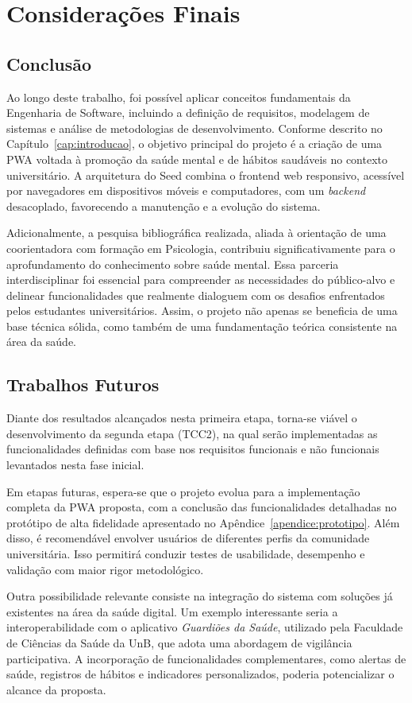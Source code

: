 \chapter{Considerações Finais}

\section{Conclusão}


Ao longo deste trabalho, foi possível aplicar conceitos fundamentais da Engenharia de Software, incluindo a definição de requisitos, modelagem de sistemas e análise de metodologias de desenvolvimento. Conforme descrito no Capítulo~\ref{cap:introducao}, o objetivo principal do projeto é a criação de uma PWA voltada à promoção da saúde mental e de hábitos saudáveis no contexto universitário. A arquitetura do Seed combina o frontend web responsivo, acessível por navegadores em dispositivos móveis e computadores, com um \textit{backend} desacoplado, favorecendo a manutenção e a evolução do sistema.

Adicionalmente, a pesquisa bibliográfica realizada, aliada à orientação de uma coorientadora com formação em Psicologia, contribuiu significativamente para o aprofundamento do conhecimento sobre saúde mental. Essa parceria interdisciplinar foi essencial para compreender as necessidades do público-alvo e delinear funcionalidades que realmente dialoguem com os desafios enfrentados pelos estudantes universitários. Assim, o projeto não apenas se beneficia de uma base técnica sólida, como também de uma fundamentação teórica consistente na área da saúde.


\section{Trabalhos Futuros}

Diante dos resultados alcançados nesta primeira etapa, torna-se viável o desenvolvimento da segunda etapa (TCC2), na qual serão implementadas as funcionalidades definidas com base nos requisitos funcionais e não funcionais levantados nesta fase inicial.

Em etapas futuras, espera-se que o projeto evolua para a implementação completa da PWA proposta, com a conclusão das funcionalidades detalhadas no protótipo de alta fidelidade apresentado no Apêndice~\ref{apendice:prototipo}. Além disso, é recomendável envolver usuários de diferentes perfis da comunidade universitária. Isso permitirá conduzir testes de usabilidade, desempenho e validação com maior rigor metodológico.

Outra possibilidade relevante consiste na integração do sistema com soluções já existentes na área da saúde digital. Um exemplo interessante seria a interoperabilidade com o aplicativo \textit{Guardiões da Saúde}, utilizado pela Faculdade de Ciências da Saúde da UnB, que adota uma abordagem de vigilância participativa. A incorporação de funcionalidades complementares, como alertas de saúde, registros de hábitos e indicadores personalizados, poderia potencializar o alcance da proposta.

